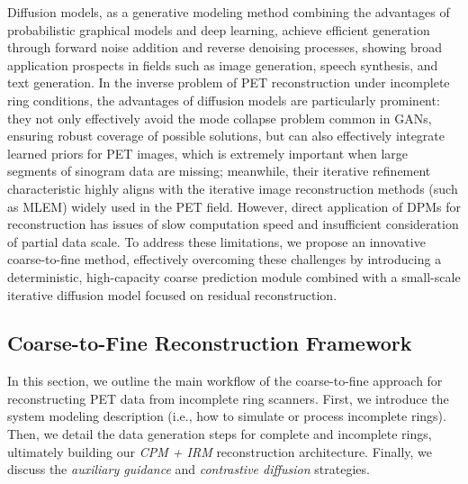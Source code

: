 \documentclass[
reprint,
superscriptaddress,
nofootinbib,
amsmath,amssymb,
aps,
prd,
]{revtex4-2}
\begin{document}
Diffusion models, as a generative modeling method combining the advantages of probabilistic graphical models and deep learning, achieve efficient generation through forward noise addition and reverse denoising processes, showing broad application prospects in fields such as image generation, speech synthesis, and text generation. In the inverse problem of PET reconstruction under incomplete ring conditions, the advantages of diffusion models are particularly prominent: they not only effectively avoid the mode collapse problem common in GANs, ensuring robust coverage of possible solutions, but can also effectively integrate learned priors for PET images, which is extremely important when large segments of sinogram data are missing; meanwhile, their iterative refinement characteristic highly aligns with the iterative image reconstruction methods (such as MLEM) widely used in the PET field. However, direct application of DPMs for reconstruction has issues of slow computation speed and insufficient consideration of partial data scale. To address these limitations, we propose an innovative coarse-to-fine method, effectively overcoming these challenges by introducing a deterministic, high-capacity coarse prediction module combined with a small-scale iterative diffusion model focused on residual reconstruction.



\subsection{Coarse-to-Fine Reconstruction Framework}

In this section, we outline the main workflow of the coarse-to-fine approach for reconstructing PET data from incomplete ring scanners. First, we introduce the system modeling description (i.e., how to simulate or process incomplete rings). Then, we detail the data generation steps for complete and incomplete rings, ultimately building our \emph{CPM + IRM} reconstruction architecture. Finally, we discuss the \emph{auxiliary guidance} and \emph{contrastive diffusion} strategies.
\end{document}
